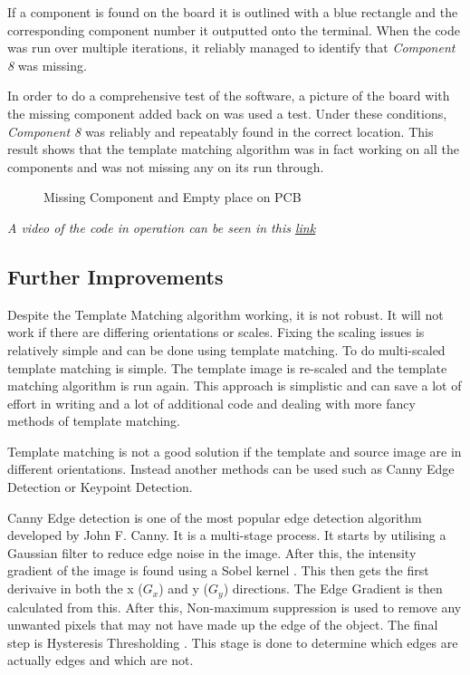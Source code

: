 \documentclass[conference]{IEEEtran}
\begin{document}
If a component is found on the board it is outlined with a blue rectangle and the corresponding component number it outputted onto the terminal. When the code was run over multiple iterations, it reliably managed to identify that \textit{Component 8} was missing. 

In order to do a comprehensive test of the software, a picture of the board with the missing component added back on was used a test. Under these conditions, \textit{Component 8} was reliably and repeatably found in the correct location. This result shows that the template matching algorithm was in fact working on all the components and was not missing any on its run through. 

\begin{figure}
\centering
{}
\caption{Missing Component and Empty place on PCB}
\label{fig:Missing_component_and_empty_place_on_PCB}
\end{figure} 

\textit{A video of the code in operation can be seen in this \href{https://youtu.be/8uITJsA60Wk}{link}}

\subsection{Further Improvements}

Despite the Template Matching algorithm working, it is not robust. It will not work if there are differing orientations or scales. Fixing the scaling issues is relatively simple and can be done using template matching. To do multi-scaled template matching is simple. The template image is re-scaled and the template matching algorithm is run again. \cite{ref:open_cv_templae_matching_scaling} This approach is simplistic and can save a lot of effort in writing and a lot of additional code and dealing with more fancy methods of template matching. 

Template matching is not a good solution if the template and source image are in different orientations. Instead another methods can be used such as Canny Edge Detection or Keypoint Detection. 

Canny Edge detection is one of the most popular edge detection algorithm developed by John F. Canny. It is a multi-stage process. It starts by utilising a Gaussian filter \cite{ref:Gaussian_filters} to reduce edge noise in the image. After this, the intensity gradient of the image is found using a Sobel kernel \cite{ref:sobel_kernal}. This then gets the first derivaive in both the x ($G_x$) and y ($G_y$) directions. The Edge Gradient is then calculated from this.  After this, Non-maximum suppression \cite{ref:non-maximum_supression} is used to remove any unwanted pixels that may not have made up the edge of the object. The final step is Hysteresis Thresholding \cite{ref:hysteresis_thresholding}. This stage is done to determine which edges are actually edges and which are not. 
\end{document}
